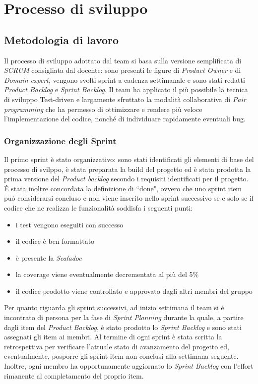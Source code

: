 \chapter{Processo di sviluppo}\label{ch:processo-di-sviluppo}
\section{Metodologia di lavoro}\label{sec:metodologia-di-lavoro}
Il processo di sviluppo adottato dal team si basa sulla versione semplificata di \textit{SCRUM} consigliata dal docente:
sono presenti le figure di \textit{Product Owner} e di \textit{Domain expert}, vengono svolti sprint a cadenza settimanale e sono stati redatti
\textit{Product Backlog} e \textit{Sprint Backlog}.
Il team ha applicato il più possibile la tecnica di sviluppo Test-driven e largamente sfruttato la modalità collaborativa di \textit{Pair programming} che ha
permesso di ottimizzare e rendere più veloce l'implementazione del codice, nonché di individuare rapidamente eventuali bug.

\subsection{Organizzazione degli Sprint}\label{subsec:organizzazione-sprint}
Il primo sprint è stato organizzativo: sono stati identificati gli elementi di base del processo di svilppo, è stata preparata la build del progetto ed è stata prodotta la prima versione del \textit{Product backlog}
secondo i requisiti identificati per il progetto.
É stata inoltre concordata la definizione di ``done", ovvero che uno sprint item può considerarsi concluso e non viene inserito
nello sprint successivo se e solo se il codice che ne realizza le funzionalità soddisfa i seguenti punti:
\begin{itemize}
    \item i test vengono eseguiti con successo
    \item il codice è ben formattato
    \item è presente la \textit{Scaladoc}
    \item la coverage viene eventualmente decrementata al più del 5\%
    \item il codice prodotto viene controllato e approvato dagli altri membri del gruppo
\end{itemize}
Per quanto riguarda gli sprint successivi, ad inizio settimana il team si è incontrato di persona per la fase di \textit{Sprint Planning} durante la quale, a partire dagli item del \textit{Product Backlog}, è stato prodotto
lo \textit{Sprint Backlog} e sono stati assegnati gli item ai membri.
Al termine di ogni sprint è stata scritta la retrospettiva per verificare l'attuale stato di avanzamento del progetto ed, eventualmente,
posporre gli sprint item non conclusi alla settimana seguente.
Inoltre, ogni membro ha opportunamente aggiornato lo \textit{Sprint Backlog} con l'effort rimanente al completamento del proprio item.


